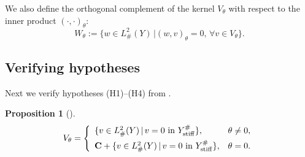 \documentclass[11pt]{article}
\newcommand\stiff{{\rm stiff}}
\newtheorem{proposition}[theorem]{Proposition}
\theoremstyle{remark}
\begin{document}
We also define the orthogonal complement of the kernel $V_\theta$ with  respect to the inner product $(\cdot,\cdot)_\theta$:
\begin{equation*}
	W_\theta :=\{w\in {L^2_\#(Y)} \, \vert (w,v)_\theta =0, \, \forall v\in V_\theta \}.
\end{equation*}



\subsection{Verifying hypotheses}

\noindent Next we verify  hypotheses (H1)--(H4) from \cite{CKS2023}.



\begin{proposition}[{\cite[Hypothesis (H2)]{CKS2023}}]
	\begin{equation}\label{156}
		V_\theta = \left\{
		\begin{array}{ll}
			\{ v\in {L^2_\#(Y)} \, \vert \, v=0 \mbox{ in } Y_\stiff^\# \}, & \theta \neq 0,
			\\
			\vspace{-8pt}
			\\
			\mathbf C + \{ v\in {L^2_\#(Y)} \, \vert \, v=0 \mbox{ in } Y_\stiff^\# \}, & \theta =0.
		\end{array}
		\right.
	\end{equation}
\end{proposition}
\end{document}
